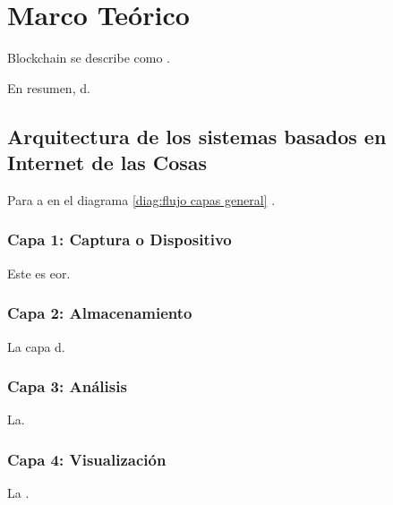 \newpage
\section{Marco Teórico}


Blockchain se describe como  \cite{aracle_2014_qu}.\hfill \break

En resumen, d.\hfill \break

\subsection{Arquitectura de los sistemas basados en Internet de las Cosas}

Para a en el diagrama \ref{diag:flujo capas general} \cite{Ávila-Camacho_Moreno-Villalba_2023}.



\subsubsection{Capa 1: Captura o Dispositivo}
 Este es eor.\hfill \break
 
 
\subsubsection{Capa 2: Almacenamiento}
La capa d.\hfill \break


\subsubsection{Capa 3: Análisis}
La.\hfill \break


\subsubsection{Capa 4: Visualización}
La .\hfill \break

